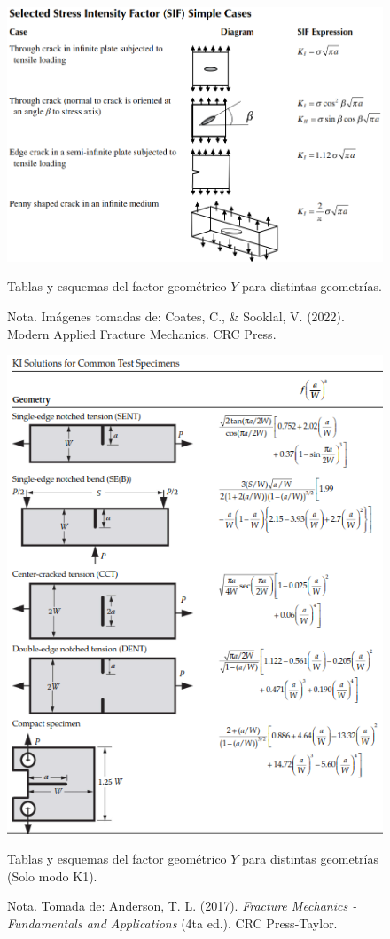 \documentclass[12pt,letterpaper]{article}
\begin{document}
\begin{figure}[H]
    \centering
    \includegraphics[width=0.95\linewidth]{cc.png} %
    \caption{Tablas y esquemas del factor geométrico $Y$ para distintas geometrías.}
    \label{fig:factor_intensidad_Y}
    \caption*{Nota. Imágenes tomadas de: Coates, C., \& Sooklal, V. (2022). Modern Applied Fracture Mechanics. CRC Press.}
    \end{figure}

\begin{figure}[H]
    \centering
    \includegraphics[width=0.85\linewidth]{d.png} %
    \caption{Tablas y esquemas del factor geométrico $Y$ para distintas geometrías (Solo modo K1).}
    \label{fig:factor_intensidad_Y2}
    \caption*{Nota. Tomada de: Anderson, T. L. (2017). \textit{Fracture Mechanics - Fundamentals and Applications} (4ta ed.). CRC Press-Taylor.}\cite{anderson2017fracture}
\end{figure}


\newpage
\printbibliography[title=Referencias]
\nocite{*} %
\end{document}
